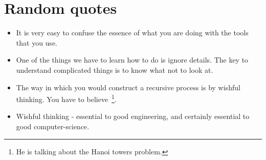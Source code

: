\documentclass[12pt,a4paper]{article}
\begin{document}
\appendix
\appendixpage

\section{Random quotes}

\begin{itemize}
\item It is very easy to confuse the essence of what you are doing with the tools that
  you use.
\item One of the things we have to learn how to do is ignore details. The key to
  understand complicated things is to know what not to look at.
\item The way in which you would construct a recursive process is by wishful thinking.
  You have to believe~\footnote{He is talking about the Hanoi towers problem.}.
\item Wishful thinking - essential to good engineering, and certainly essential to good
  computer-science.
\end{itemize}

\nocite{*}


\end{document}
